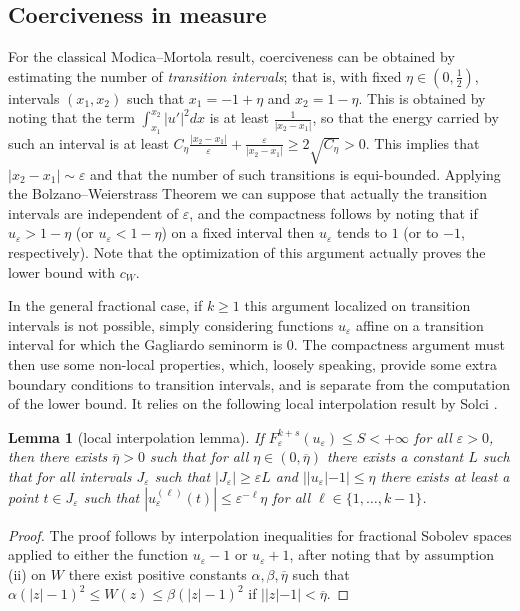 \documentclass{article}
\newtheorem{lemma}{Lemma}%
\newcommand{\e}{\varepsilon}
\begin{document}
\subsection{Coerciveness in measure}
For the classical Modica--Mortola result, coerciveness can be obtained by estimating the number of {\em transition intervals}; that is, with fixed  $\eta\in(0,\tfrac12)$, intervals $(x_1,x_2)$ such that $x_1=-1+\eta$ and $x_2=1-\eta$.
This is obtained by noting that the term $\int_{x_1}^{x_2}|u'|^2dx$ is at least $\tfrac1{|x_2-x_1|}$, so that the energy carried by such an interval is at least $ C_\eta\tfrac{|x_2-x_1|}\e+\tfrac\e{|x_2-x_1|}\ge 2\sqrt{C_\eta}>0$. This implies that $|x_2-x_1|\sim\e$ and that the number of such transitions is equi-bounded. Applying the Bolzano--Weierstrass Theorem we can suppose that actually the transition intervals are independent of $\e$, and the compactness follows by noting that if $u_\e>1-\eta$ (or $u_\e<1-\eta$) on a fixed interval then $u_\e$ tends to $1$ (or to $-1$, respectively). Note that the optimization of this argument actually proves the lower bound with $c_W$.  

In the general fractional case, if $k\ge 1$ this argument localized on transition intervals is not possible, simply considering functions $u_\e$ affine on a transition interval for which the Gagliardo seminorm is $0$. The compactness argument must then use some non-local properties, which,  loosely speaking, provide some extra boundary conditions to transition intervals, and is separate from the computation of the lower bound. It relies on the following local interpolation result by Solci \cite[Lemma 6]{Solci}.

\begin{lemma}[local interpolation lemma]\label{lemmac}
If $F^{k+s}_\e(u_\e)\le S<+\infty$ for all $\e>0$, then there exists $\overline \eta>0$ such that for all $\eta\in (0,\overline\eta)$ there exists a constant $L$ such that for all intervals $J_\e$ such that $|J_\e|\ge \e L$ and $||u_\e|-1|\le \eta$ there exists at least a point $t\in J_\e$ such that $|u_\e^{(\ell)}(t)|\le \e^{-\ell} \eta$ for all $\ell\in\{1,\ldots, k-1\}$.
\end{lemma}

\begin{proof} The proof follows by interpolation inequalities for fractional Sobolev spaces applied to either the function $u_\e-1$ or $u_\e+1$, after noting that by assumption (ii) on $W$ there exist positive constants $\alpha, \beta,\overline\eta$ such that $\alpha(|z|-1)^2\le W(z)\le \beta (|z|-1)^2$ if $||z|-1|<\overline\eta$. 
\end{proof}
\end{document}
